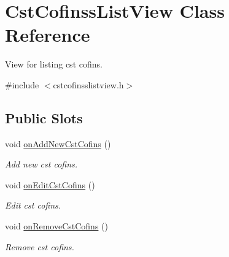 \hypertarget{class_cst_cofinss_list_view}{\section{\-Cst\-Cofinss\-List\-View \-Class \-Reference}
\label{class_cst_cofinss_list_view}
}


\-View for listing cst cofins.  




{\ttfamily \#include $<$cstcofinsslistview.\-h$>$}

\subsection*{\-Public \-Slots}
\begin{DoxyCompactItemize}
\item 
void \hyperlink{class_cst_cofinss_list_view_a35a13b746a0b84f8f176c64df9487c58}{on\-Add\-New\-Cst\-Cofins} ()
\begin{DoxyCompactList}\small\item\em \-Add new cst cofins. \end{DoxyCompactList}\item 
void \hyperlink{class_cst_cofinss_list_view_a62af8d02bada5f59a5aa695637afce6e}{on\-Edit\-Cst\-Cofins} ()
\begin{DoxyCompactList}\small\item\em \-Edit cst cofins. \end{DoxyCompactList}\item 
void \hyperlink{class_cst_cofinss_list_view_a554b7b432ff328f5cbb3fe38ffa1460a}{on\-Remove\-Cst\-Cofins} ()
\begin{DoxyCompactList}\small\item\em \-Remove cst cofins. \end{DoxyCompactList}\end{DoxyCompactItemize}
